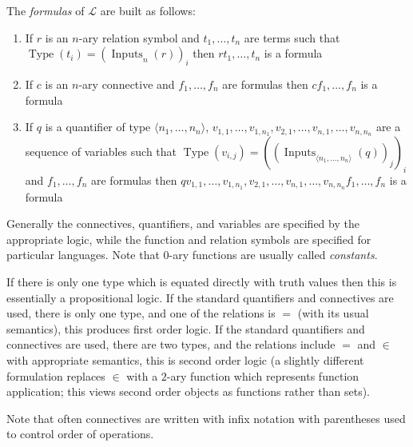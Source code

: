 \documentclass[12pt]{article}
\begin{document}
The \emph{formulas} of $\mathcal{L}$ are built as follows:
\begin{enumerate}
\item If $r$ is an $n$-ary relation symbol and $t_1,\ldots,t_n$ are terms such that $\operatorname{Type}(t_i)=(\operatorname{Inputs}_n(r))_i$ then $rt_1,\ldots,t_n$ is a formula

\item If $c$ is an $n$-ary connective and $f_1,\ldots,f_n$ are formulas then $cf_1,\ldots,f_n$ is a formula

\item If $q$ is a quantifier of type $\langle n_1,\ldots,n_n\rangle$, $v_{1,1},\ldots,v_{1,n_1},v_{2,1},\ldots,v_{n,1},\ldots,v_{n,n_n}$ are a sequence of variables such that $\operatorname{Type}(v_{i,j})=((\operatorname{Inputs}_{\langle n_1,\ldots,n_n\rangle}(q))_j)_i$ and $f_1,\ldots,f_n$ are formulas then $qv_{1,1},\ldots,v_{1,n_1},v_{2,1},\ldots,v_{n,1},\ldots,v_{n,n_n}f_1,\ldots,f_n$ is a formula
\end{enumerate}



Generally the connectives, quantifiers, and variables are specified by the appropriate logic, while the function and relation symbols are specified for particular languages.  Note that $0$-ary functions are usually called \emph{constants}.

If there is only one type which is equated directly with truth values then this is essentially a propositional logic.  If the standard quantifiers and connectives are used, there is only one type, and one of the relations is $=$ (with its usual semantics), this produces first order logic.  If the standard quantifiers and connectives are used, there are two types, and the relations include $=$ and $\in$ with appropriate semantics, this is second order logic (a slightly different formulation replaces $\in$ with a $2$-ary function which represents function application; this views second order objects as functions rather than sets).

Note that often connectives are written with infix notation with parentheses used to control order of operations.
\end{document}
